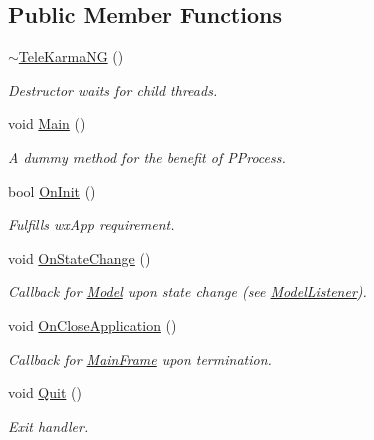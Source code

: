 \subsection*{Public Member Functions}
\begin{CompactItemize}
\item 
\hyperlink{classTeleKarmaNG_a0decf4d37075fe5a6ca8009996f9cce}{$\sim$TeleKarmaNG} ()
\begin{CompactList}\small\item\em Destructor waits for child threads. \item\end{CompactList}\item 
void \hyperlink{classTeleKarmaNG_9e2c67bec8a3794e755ee1d91a18a9fa}{Main} ()
\begin{CompactList}\small\item\em A dummy method for the benefit of PProcess. \item\end{CompactList}\item 
bool \hyperlink{classTeleKarmaNG_87ccb2d5650091ba595c4b7bd832d752}{OnInit} ()
\begin{CompactList}\small\item\em Fulfills wxApp requirement. \item\end{CompactList}\item 
void \hyperlink{classTeleKarmaNG_ce1e8d62f3e1d586e2aa5d2012c9a766}{OnStateChange} ()
\begin{CompactList}\small\item\em Callback for \hyperlink{classModel}{Model} upon state change (see \hyperlink{classModelListener}{ModelListener}). \item\end{CompactList}\item 
void \hyperlink{classTeleKarmaNG_54349ac49ff1575dfd1b158ef0842895}{OnCloseApplication} ()
\begin{CompactList}\small\item\em Callback for \hyperlink{classMainFrame}{MainFrame} upon termination. \item\end{CompactList}\item 
void \hyperlink{classTeleKarmaNG_cf965461b8261feb570acbaa88e4452d}{Quit} ()
\begin{CompactList}\small\item\em Exit handler. \item\end{CompactList}\end{CompactItemize}


